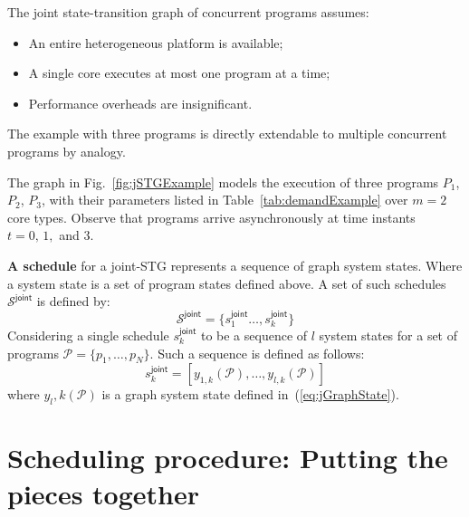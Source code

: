 The joint state-transition graph of concurrent programs assumes:
%
\begin{itemize}
\item An entire heterogeneous platform is available;
\item A single core executes at most one program at a time;
\item Performance overheads are insignificant.
\end{itemize}
%
The example with three programs is directly extendable to multiple concurrent programs by analogy.

The graph in Fig.~\ref{fig:jSTGExample} models the execution of three programs $P_1$, $P_2$, $P_3$, with their parameters listed in Table~\ref{tab:demandExample} over $m=2$ core types. Observe that programs arrive asynchronously at time instants $t=0,\,1,$ and $3$.

\textbf{A schedule} for a joint-STG represents a sequence of graph system states. Where a system state is a set of program states defined above. A set of such schedules $\mathcal{S}^\mathsf{joint}$ is defined by:
%
\begin{equation}
\mathcal{S}^\mathsf{joint}=\{ s_1^\mathsf{joint}\ldots,s_k^\mathsf{joint}\}
\end{equation}
%
Considering a single schedule $s^\mathsf{joint}_k$ to be a sequence of $l$ system states for a set of programs $\mathcal{P}=\{p_1,\ldots, p_N\}$. Such a sequence is defined as follows:
%
\begin{equation}
s^\mathsf{joint}_k = \left[y_{1,k}(\mathcal{P}),\ldots,y_{l,k}(\mathcal{P})\right]
\end{equation}
%
where $y_l,k(\mathcal{P})$ is a graph system state defined in~(\ref{eq:jGraphState}).






\section{Scheduling procedure: Putting the pieces together}
\label{sec:schedulingProcedure}

